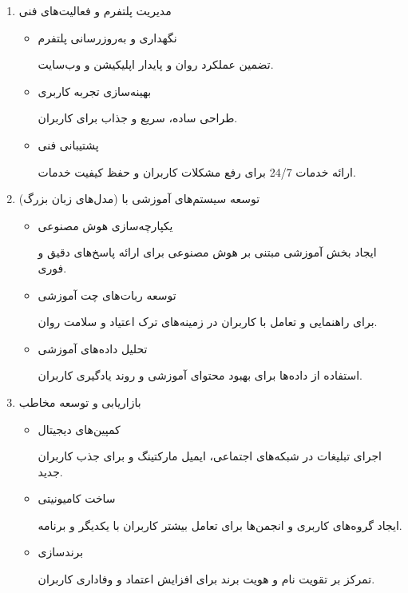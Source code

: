 \documentclass[dvipsnames, svgnames, x11names, 11pt]{article}
\begin{document}
\begin{itemize}
\begin{enumerate}
\item 
مدیریت پلتفرم و فعالیت‌های فنی  
\begin{itemize}
\item 
نگهداری و به‌روزرسانی پلتفرم

تضمین عملکرد روان و پایدار اپلیکیشن و وب‌سایت.  

\item 
بهینه‌سازی تجربه کاربری 

طراحی ساده، سریع و جذاب برای کاربران.  

\item 
پشتیبانی فنی

ارائه خدمات 24/7 برای رفع مشکلات کاربران و حفظ کیفیت خدمات.  
\end{itemize}

\item 
توسعه سیستم‌های آموزشی با  (مدل‌های زبان بزرگ)  

\begin{itemize}
\item 
یکپارچه‌سازی هوش مصنوعی

ایجاد بخش آموزشی مبتنی بر هوش مصنوعی برای ارائه پاسخ‌های دقیق و فوری.  

\item 
توسعه ربات‌های چت آموزشی

برای راهنمایی و تعامل با کاربران در زمینه‌های ترک اعتیاد و سلامت روان.  

\item 
تحلیل داده‌های آموزشی

استفاده از داده‌ها برای بهبود محتوای آموزشی و روند یادگیری کاربران.  
\end{itemize}

\item 
بازاریابی و توسعه مخاطب  

\begin{itemize}
\item 
کمپین‌های دیجیتال

اجرای تبلیغات در شبکه‌های اجتماعی، ایمیل مارکتینگ و  برای جذب کاربران جدید.  

\item 
ساخت کامیونیتی

ایجاد گروه‌های کاربری و انجمن‌ها برای تعامل بیشتر کاربران با یکدیگر و برنامه.  

\item 
برندسازی

تمرکز بر تقویت نام و هویت برند برای افزایش اعتماد و وفاداری کاربران.  
\end{itemize}


\end{enumerate}
\end{itemize}
\end{document}
